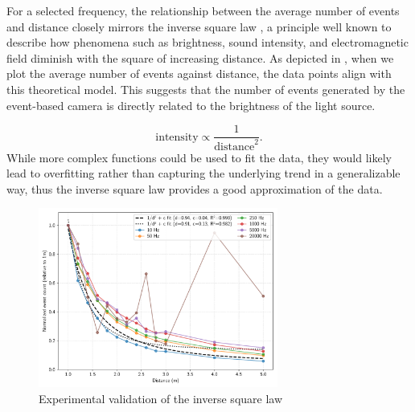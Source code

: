 For a selected frequency, the relationship between the average number of events and distance closely mirrors the inverse square
law , a principle well known to describe how phenomena such as brightness, sound intensity, and electromagnetic field
diminish with the square of increasing distance.
As depicted in , when we plot the average number of events against distance, the data points align with this theoretical model.
This suggests that the number of events generated by the event-based camera is directly related to the brightness of the light source.

\begin{equation}
    \text{intensity} \propto \frac{1}{\text{distance}^2} .
    \label{eq:inv_square_law}
\end{equation}
While more complex functions could be used to fit the data, they would likely lead to overfitting rather than capturing the underlying trend in a generalizable way, thus the inverse square law provides a good approximation of the data.
\begin{figure}[H]
	\centering
	\includegraphics[width=0.70\textwidth]{./fig/pgfplot/build/inv_square.pdf}
	\caption{Experimental validation of the inverse square law}
	\label{fig:fit1}
\end{figure}

